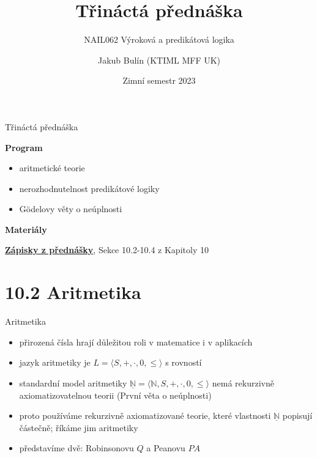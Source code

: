 \documentclass{beamer}
\title{Třináctá přednáška}
\subtitle{NAIL062 Výroková a predikátová logika}
\author{Jakub Bulín (KTIML MFF UK)}
\date{Zimní semestr 2023}
\begin{document}
\maketitle


\begin{frame}{Třináctá přednáška}

    \textbf{Program}
        \begin{itemize}
            \item aritmetické teorie
            \item nerozhodnutelnost predikátové logiky
            \item Gödelovy věty o neúplnosti
        \end{itemize}      
    
    \textbf{Materiály}

        \href{https://github.com/jbulin-mff-uk/nail062/raw/main/lecture/lecture-notes/lecture-notes.pdf}{\alert{\textbf{Zápisky z přednášky}}}, Sekce 10.2-10.4 z Kapitoly 10

\end{frame}


\section{10.2 Aritmetika}


\begin{frame}{Aritmetika}

    \begin{itemize}
        \item přirozená čísla hrají důležitou roli v matematice i v aplikacích
        \item \alert{jazyk aritmetiky} je $L=\langle S,+,\cdot,0,\leq\rangle$ s rovností
        \item \alert{standardní model aritmetiky}  $\underline{\mathbb N}=\langle\mathbb N,S,+,\cdot,0,\leq\rangle$ nemá rekurzivně axiomatizovatelnou teorii (První věta o neúplnosti)
        \item proto používáme rekurzivně axiomatizované teorie, které vlastnosti $\underline{\mathbb N}$ popisují částečně; říkáme jim \alert{aritmetiky}       
        \item představíme dvě: \alert{Robinsonovu} $Q$ a \alert{Peanovu} $PA$
    \end{itemize}

\end{frame}
\end{document}
